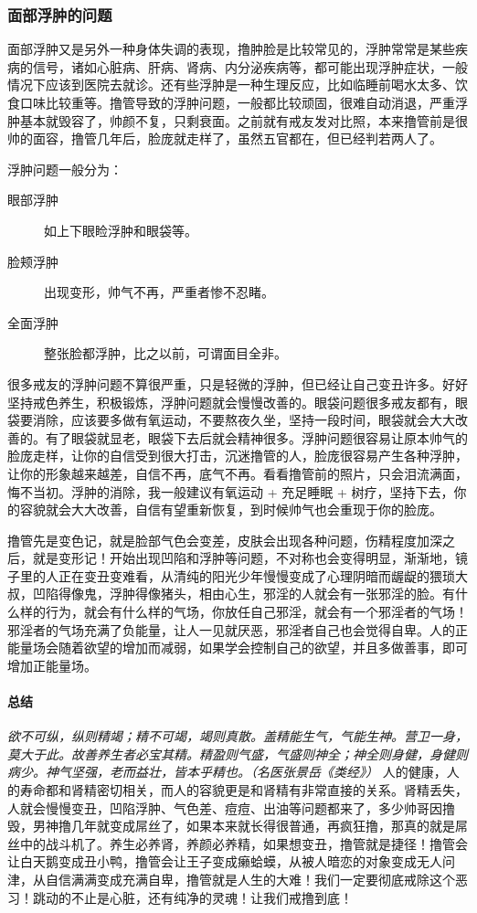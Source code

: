\subsubsection{面部浮肿的问题}

面部浮肿又是另外一种身体失调的表现，撸肿脸是比较常见的，浮肿常常是某些疾病的信号，诸如心脏病、肝病、肾病、内分泌疾病等，都可能出现浮肿症状，一般情况下应该到医院去就诊。还有些浮肿是一种生理反应，比如临睡前喝水太多、饮食口味比较重等。撸管导致的浮肿问题，一般都比较顽固，很难自动消退，严重浮肿基本就毁容了，帅颜不复，只剩衰面。之前就有戒友发对比照，本来撸管前是很帅的面容，撸管几年后，脸庞就走样了，虽然五官都在，但已经判若两人了。

浮肿问题一般分为：

\begin{description}
    \item[眼部浮肿] 如上下眼睑浮肿和眼袋等。
    \item[脸颊浮肿] 出现变形，帅气不再，严重者惨不忍睹。
    \item[全面浮肿] 整张脸都浮肿，比之以前，可谓面目全非。
\end{description}

很多戒友的浮肿问题不算很严重，只是轻微的浮肿，但已经让自己变丑许多。好好坚持戒色养生，积极锻炼，浮肿问题就会慢慢改善的。眼袋问题很多戒友都有，眼袋要消除，应该要多做有氧运动，不要熬夜久坐，坚持一段时间，眼袋就会大大改善的。有了眼袋就显老，眼袋下去后就会精神很多。浮肿问题很容易让原本帅气的脸庞走样，让你的自信受到很大打击，沉迷撸管的人，脸庞很容易产生各种浮肿，让你的形象越来越差，自信不再，底气不再。看看撸管前的照片，只会泪流满面，悔不当初。浮肿的消除，我一般建议有氧运动 + 充足睡眠 + 树疗，坚持下去，你的容貌就会大大改善，自信有望重新恢复，到时候帅气也会重现于你的脸庞。

撸管先是变色记，就是脸部气色会变差，皮肤会出现各种问题，伤精程度加深之后，就是变形记！开始出现凹陷和浮肿等问题，不对称也会变得明显，渐渐地，镜子里的人正在变丑变难看，从清纯的阳光少年慢慢变成了心理阴暗而龌龊的猥琐大叔，凹陷得像鬼，浮肿得像猪头，相由心生，邪淫的人就会有一张邪淫的脸。有什么样的行为，就会有什么样的气场，你放任自己邪淫，就会有一个邪淫者的气场！邪淫者的气场充满了负能量，让人一见就厌恶，邪淫者自己也会觉得自卑。人的正能量场会随着欲望的增加而减弱，如果学会控制自己的欲望，并且多做善事，即可增加正能量场。

\paragraph*{总结}

\textit{欲不可纵，纵则精竭；精不可竭，竭则真散。盖精能生气，气能生神。营卫一身，莫大于此。故善养生者必宝其精。精盈则气盛，气盛则神全；神全则身健，身健则病少。神气坚强，老而益壮，皆本乎精也。（名医张景岳《类经》）} 人的健康，人的寿命都和肾精密切相关，而人的容貌更是和肾精有非常直接的关系。肾精丢失，人就会慢慢变丑，凹陷浮肿、气色差、痘痘、出油等问题都来了，多少帅哥因撸毁，男神撸几年就变成屌丝了，如果本来就长得很普通，再疯狂撸，那真的就是屌丝中的战斗机了。养生必养肾，养颜必养精，如果想变丑，撸管就是捷径！撸管会让白天鹅变成丑小鸭，撸管会让王子变成癞蛤蟆，从被人暗恋的对象变成无人问津，从自信满满变成充满自卑，撸管就是人生的大难！我们一定要彻底戒除这个恶习！跳动的不止是心脏，还有纯净的灵魂！让我们戒撸到底！
